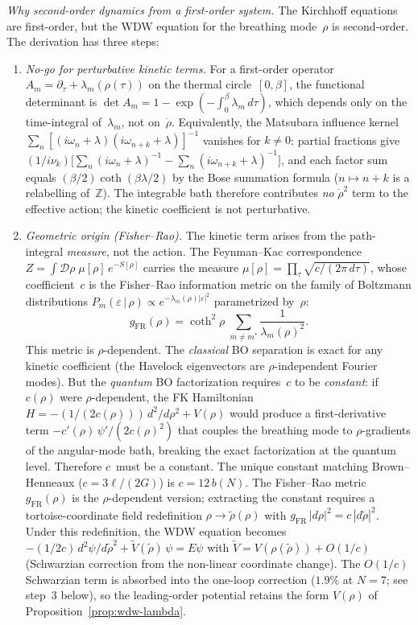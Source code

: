 \emph{Why second-order dynamics from a first-order system.}
The Kirchhoff equations are first-order, but the WDW equation
for the breathing mode~$\rho$ is second-order.
The derivation has three steps:
\begin{enumerate}
\item \emph{No-go for perturbative kinetic terms.}
  For a first-order operator $A_m = \partial_\tau + \lambda_m(\rho(\tau))$
  on the thermal circle~$[0,\beta]$, the functional determinant is
  $\det A_m = 1 - \exp(-\!\int_0^\beta\!\lambda_m\,d\tau)$,
  which depends only on the time-integral of~$\lambda_m$, not
  on~$\dot\rho$.
  Equivalently, the Matsubara influence kernel
  $\sum_n[(i\omega_n{+}\lambda)(i\omega_{n+k}{+}\lambda)]^{-1}$
  vanishes for $k \ne 0$: partial fractions give
  $(1/i\nu_k)\bigl[\sum_n(i\omega_n{+}\lambda)^{-1}
  - \sum_n(i\omega_{n+k}{+}\lambda)^{-1}\bigr]$,
  and each factor sum equals $({\beta}/{2})\coth({\beta\lambda}/{2})$
  by the Bose summation formula
  ($n \mapsto n{+}k$ is a relabelling of~$\mathbb{Z}$).
  The integrable bath therefore contributes \emph{no}
  $\dot\rho^2$ term to the effective action;
  the kinetic coefficient is not perturbative.

\item \emph{Geometric origin (Fisher--Rao).}
  The kinetic term arises from the path-integral
  \emph{measure}, not the action.
  The Feynman--Kac correspondence
  $Z = \int\!\mathcal{D}\rho\;\mu[\rho]\,e^{-S[\rho]}$
  carries the measure
  $\mu[\rho] = \prod_\tau\!\sqrt{c/(2\pi\,d\tau)}$,
  whose coefficient~$c$ is the Fisher--Rao information metric
  on the family of Boltzmann distributions
  $P_m(\varepsilon\,|\,\rho) \propto e^{-\lambda_m(\rho)|\varepsilon|^2}$
  parametrized by~$\rho$:
  \[
    g_{\mathrm{FR}}(\rho)
    = \coth^2\!\rho\;\sum_{m \ne m^*}\frac{1}{\lambda_m(\rho)^2}.
  \]
  This metric is $\rho$-dependent.
  The \emph{classical} BO separation is exact for any
  kinetic coefficient (the Havelock eigenvectors are
  $\rho$-independent Fourier modes).
  But the \emph{quantum} BO factorization requires~$c$
  to be \emph{constant}: if $c(\rho)$ were
  $\rho$-dependent, the FK Hamiltonian
  $H = -(1/(2c(\rho)))\,d^2/d\rho^2 + V(\rho)$
  would produce a first-derivative term
  $-c'(\rho)\,\psi'/(2c(\rho)^2)$
  that couples the breathing mode to
  $\rho$-gradients of the angular-mode bath,
  breaking the exact factorization at the quantum level.
  Therefore $c$~must be a constant.
  The unique constant matching Brown--Henneaux
  ($c = 3\ell/(2G)$) is $c = 12\,b(N)$.
  The Fisher--Rao metric $g_{\mathrm{FR}}(\rho)$ is
  the $\rho$-dependent version; extracting the constant
  requires a tortoise-coordinate field redefinition
  $\rho \to \tilde\rho(\rho)$ with
  $g_{\mathrm{FR}}\,|d\rho|^2 = c\,|d\tilde\rho|^2$.
  Under this redefinition, the WDW equation becomes
  $-(1/2c)\,d^2\psi/d\tilde\rho^2
  + \tilde{V}(\tilde\rho)\,\psi = E\psi$
  with $\tilde{V} = V(\rho(\tilde\rho))
  + O(1/c)$ (Schwarzian correction from the
  non-linear coordinate change).
  The $O(1/c)$ Schwarzian term is absorbed into
  the one-loop correction
  ($1.9\%$ at $N = 7$; see step~3 below),
  so the leading-order potential retains the form
  $V(\rho)$ of Proposition~\ref{prop:wdw-lambda}.


\end{enumerate}
